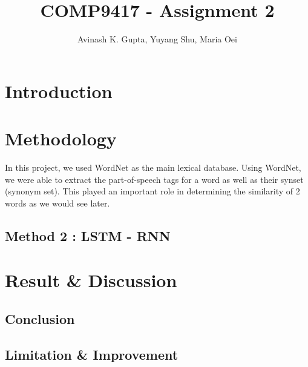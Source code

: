 \documentclass[11pt, oneside]{article}   	%
\title{COMP9417 - Assignment 2}
\author{Avinash K. Gupta, Yuyang Shu, Maria Oei}
\begin{document}
\maketitle

\section{Introduction}



\section{Methodology}
In this project, we used WordNet as the main lexical database. Using WordNet, we were able to extract the part-of-speech tags for a word as well as their synset (synonym set). This played an important role in determining the similarity of 2 words as we would see later.





\pagebreak
\subsection{Method 2 : LSTM - RNN}
%



\section{Result & Discussion}
%

\subsection{Conclusion}
 \subsection{Limitation \& Improvement}
\end{document}
